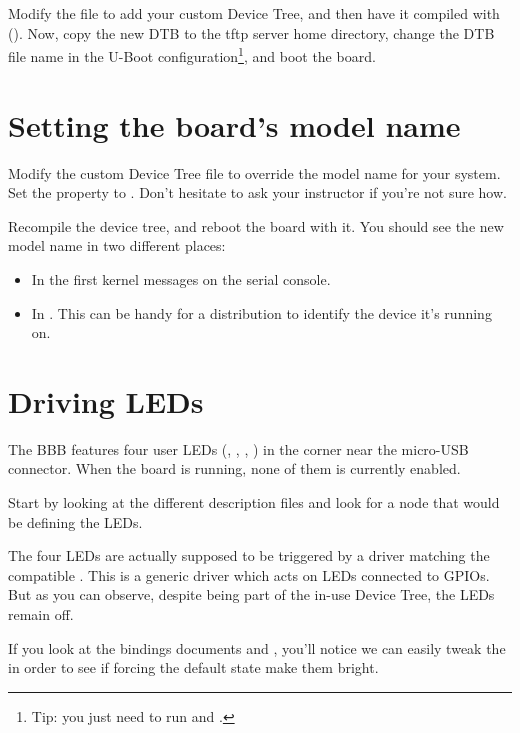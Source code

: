 Modify the  file to add your custom
Device Tree, and then have it compiled with (). Now,
copy the new DTB to the tftp server home directory, change the DTB file
name in the U-Boot configuration\footnote{Tip: you just need to run
 and .}, and boot the board.

\section{Setting the board's model name}

Modify the custom Device Tree file to override the model name for your
system. Set the  property to . Don't hesitate to ask your instructor if you're not sure how.

Recompile the device tree, and reboot the board with it. You should see
the new model name in two different places:

\begin{itemize}
\item In the first kernel messages on the serial console.
\item In . This can be
      handy for a distribution to identify the device it's running on.
\end{itemize}

\section{Driving LEDs}

The BBB features four user LEDs (, , ,
) in the corner near the micro-USB connector. When the board
is running, none of them is currently enabled.

Start by looking at the different description files and look for a node
that would be defining the LEDs.

The four LEDs are actually supposed to be triggered by a driver matching
the compatible . This is a generic driver which acts on
LEDs connected to GPIOs. But as you can observe, despite being part of
the in-use Device Tree, the LEDs remain off.

If you look at the bindings documents
 and
, you'll
notice we can easily tweak the  in order to see if
forcing the default state make them bright.

